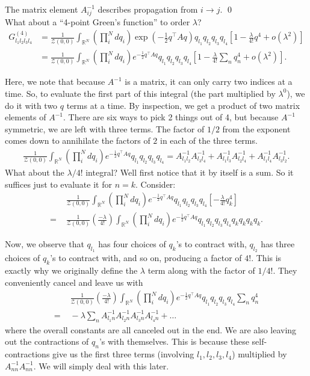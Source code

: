 \documentclass{book}
\theoremstyle{definition}
\newcommand{\f}[2]{\frac{#1}{#2}}
\newcommand{\lp}{\left(}
\newcommand{\rp}{\right)}
\newcommand{\lb}{\left[}
\newcommand{\rb}{\right]}
\newcommand{\Z}{\mathcal{Z}}
\begin{document}
The matrix element $A^{-1}_{ij}$ describes propagation from $i \to j$. \qed\\


What about a ``4-point Green's function'' to order $\lambda$?
\begin{align}
G^{(4)}_{l_1l_2l_3l_4} &= \f{1}{\Z(0,0)} \int_{\mathbb{R}^N} \lp\prod_i^N dq_i \rp \exp\lp -\f{1}{2}q^\top A q  \rp q_{l_1}q_{l_2}q_{l_3}q_{l_4} \lb 1 - \f{\lambda}{4!}q^4 + o(\lambda^2) \rb \nonumber \\
&= \f{1}{\Z(0,0)} \int_{\mathbb{R}^N} \lp\prod_i^N dq_i \rp e^{ -\f{1}{2}q^\top A q  } q_{l_1}q_{l_2}q_{l_3}q_{l_4} \lb 1 - \f{\lambda}{4!} \sum_n q_n^4 + o(\lambda^2) \rb.
\end{align}

Here, we note that because $A^{-1}$ is a matrix, it can only carry two indices at a time. So, to evaluate the first part of this integral (the part multiplied by $\lambda^0$), we do it with two $q$ terms at a time. By inspection, we get a product of two matrix elements of $A^{-1}$. There are six ways to pick 2 things out of 4, but because $A^{-1}$ symmetric, we are left with three terms. The factor of $1/2$ from the exponent comes down to annihilate the factors of $2$ in each of the three terms. 
\begin{align}
\f{1}{\Z(0,0)} \int_{\mathbb{R}^N} \lp\prod_i^N dq_i \rp e^{ -\f{1}{2}q^\top A q  } q_{l_1}q_{l_2}q_{l_3}q_{l_4} = A^{-1}_{l_1l_2}A^{-1}_{l_3l_4} + A^{-1}_{l_1l_3}A^{-1}_{l_2l_4} + A^{-1}_{l_1l_4}A^{-1}_{l_3l_2}.
\end{align}
What about the $\lambda/4!$ integral? Well first notice that it by itself is a sum. So it suffices just to evaluate it for $n=k$. Consider:
\begin{align}
&\,\,\f{1}{\Z(0,0)} \int_{\mathbb{R}^N} \lp\prod_i^N dq_i \rp e^{ -\f{1}{2}q^\top A q  } q_{l_1}q_{l_2}q_{l_3}q_{l_4} \lb  - \f{\lambda}{4!} q_k^4  \rb \\ 
= &\,\, \f{1}{\Z(0,0)} \lp \f{-\lambda}{4!} \rp \int_{\mathbb{R}^N} \lp\prod_i^N dq_i \rp e^{ -\f{1}{2}q^\top A q  } q_{l_1}q_{l_2}q_{l_3}q_{l_4}q_k q_k q_k q_k. 
\end{align}


Now, we observe that $q_{l_1}$ has four choices of $q_k$'s to contract with, $q_{l_2}$ has three choices of $q_k$'s to contract with, and so on, producing a factor of $4!$. This is exactly why we originally define the $\lambda$ term along with the factor of $1/4!$. They conveniently cancel and leave us with
\begin{align}\label{high-moment}
 &\,\, \f{1}{\Z(0,0)} \lp \f{-\lambda}{4!} \rp \int_{\mathbb{R}^N} \lp\prod_i^N dq_i \rp e^{ -\f{1}{2}q^\top A q  } q_{l_1}q_{l_2}q_{l_3}q_{l_4}\sum_{n}q_n^4 \nonumber \\
=&\,\,  -\lambda  \sum_n A^{-1}_{l_1n}A^{-1}_{l_2n}A^{-1}_{l_3n}A^{-1}_{l_4n} + \dots
\end{align}
where the overall constants are all canceled out in the end. We are also leaving out the contractions of $q_n$'s with themselves. This is because these self-contractions give us the first three terms (involving $l_1, l_2, l_3, l_4$) multiplied by $A^{-1}_{nn}A^{-1}_{nn}$. We will simply deal with this later. \\
\end{document}
